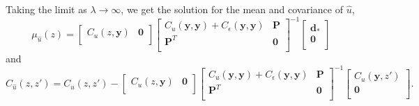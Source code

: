 \documentclass[10pt,a4paper]{article}
\begin{document}
Taking the limit as $\lambda \to \infty$, we get the solution for the mean and covariance of $\hat{u}$,
 \begin{equation}\label{eq:PosteriorMean3}
\mu_{\hat{u}}(z) =
\left[ 
\begin{array}{cc}
C_u(z,\bm{y}) & \bm{0} \\
\end{array}
\right]
\left[
\begin{array}{cc}
C_u(\bm{y},\bm{y}) + C_\epsilon(\bm{y},\bm{y}) & \bm{P} \\
\bm{P}^T  & \bm{0} \\
\end{array}
\right]^{-1}
\left[
\begin{array}{c}
\bm{d}_* \\
\bm{0} \\
\end{array}
\right]
\end{equation}    
and
\begin{equation}\label{eq:PosteriorCov3}
C_{\hat{u}}(z,z') = 
C_u(z,z') - 
\left[ 
\begin{array}{cc}
C_u(z,\bm{y}) & \bm{0} \\
\end{array}
\right]
\left[
\begin{array}{cc}
C_u(\bm{y},\bm{y}) + C_\epsilon(\bm{y},\bm{y}) & \bm{P} \\
\bm{P}^T  & \bm{0} \\
\end{array}
\right]^{-1}
\left[
\begin{array}{c}
C_u(\bm{y},z') \\
\bm{0} \\
\end{array}
\right].
\end{equation}
\end{document}
